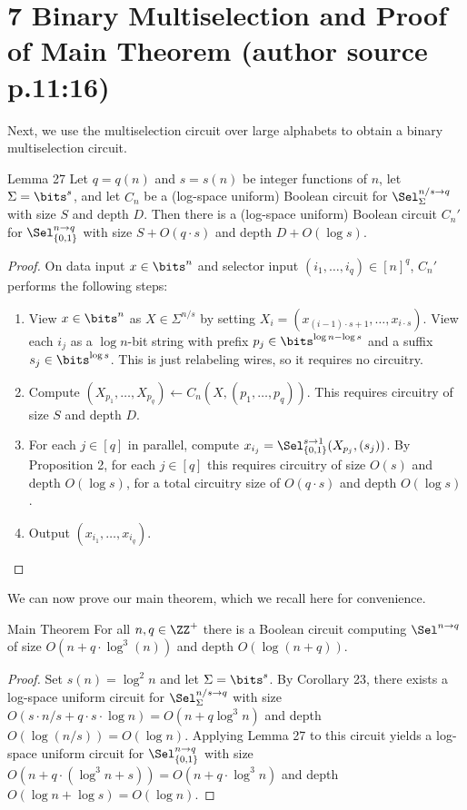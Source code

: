 \section*{7 Binary Multiselection and Proof of Main Theorem (author source p.11:16)}
Next, we use the multiselection circuit over large alphabets to obtain a binary multiselection circuit.
\begin{originalresult}{Lemma 27}
Let $q=q(n)$ and $s=s(n)$ be integer functions of $n$, let $\Sigma=\bits^s$, and let $C_n$ be a (log-space uniform) Boolean circuit for $\Sel_\Sigma^{n/s\to q}$ with size $S$ and depth $D$.
Then there is a (log-space uniform) Boolean circuit $C_n'$ for $\Sel_{\{0,1\}}^{n\to q}$ with size $S+O(q\cdot s)$ and depth $D+O(\log s)$.
\end{originalresult}
\begin{proof}
On data input $x\in\bits^n$ and selector input $(i_1,\ldots,i_q)\in[n]^q$, $C_n'$ performs the following steps:
\begin{enumerate}
\item View $x\in\bits^n$ as $X\in\Sigma^{n/s}$ by setting $X_i=(x_{(i-1)\cdot s+1},\ldots,x_{i\cdot s})$. View each $i_j$ as a $\log n$-bit string with prefix $p_j\in\bits^{\log n-\log s}$ and a suffix $s_j\in\bits^{\log s}$. This is just relabeling wires, so it requires no circuitry.
\item Compute $(X_{p_1},\ldots,X_{p_q})\leftarrow C_n(X,(p_1,\ldots,p_q))$. This requires circuitry of size $S$ and depth $D$.
\item For each $j\in[q]$ in parallel, compute $x_{i_j}=\Sel_{\{0,1\}}^{s\to1}(X_{p_j},(s_j))$. By Proposition 2, for each $j\in[q]$ this requires circuitry of size $O(s)$ and depth $O(\log s)$, for a total circuitry size of $O(q\cdot s)$ and depth $O(\log s)$.
\item Output $(x_{i_1},\ldots,x_{i_q})$.
\end{enumerate}
\end{proof}
We can now prove our main theorem, which we recall here for convenience.
\begin{originalresult}{Main Theorem}
For all $n,q\in\ZZ^+$ there is a Boolean circuit computing $\Sel^{n\to q}$ of size $O(n+q\cdot\log^3(n))$ and depth $O(\log(n+q))$.
\end{originalresult}
\begin{proof}
Set $s(n)=\log^2n$ and let $\Sigma=\bits^s$. By Corollary 23, there exists a log-space uniform circuit for $\Sel_\Sigma^{n/s\to q}$ with size $O(s\cdot n/s+q\cdot s\cdot\log n)=O(n+q\log^3n)$ and depth $O(\log(n/s))=O(\log n)$. Applying Lemma 27 to this circuit yields a log-space uniform circuit for $\Sel_{\{0,1\}}^{n\to q}$ with size $O(n+q\cdot(\log^3n+s))=O(n+q\cdot\log^3n)$ and depth $O(\log n+\log s)=O(\log n)$.
\end{proof}
